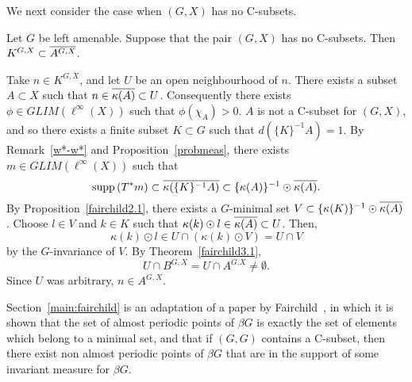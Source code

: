 We next consider the case when $(G,X)$ has no C-subsets.

\begin{proposition}
Let $G$ be left amenable.  Suppose that the pair $(G,X)$ has no C-subsets.
Then $K^{G,X} \subset \overline{A^{G,X}}$.
\end{proposition}
\proof
Take $n\in K^{G,X}$, and let $U$ be an open neighbourhood of $n$.  There exists a subset
$A\subset X$ such that $n\in \overline{\kappa(A)} \subset U$.  Consequently there exists $\phi\in GLIM(\ell^\infty(X))$
such that $\phi(\chi_A) > 0$.  $A$ is not a C-subset for $(G,X)$, and so there exists a finite
subset $K\subset G$ such that $d(\{K\}^{-1}A) = 1$.  By Remark~\ref{w*-w*} and
Proposition~\ref{probmeas}, there exists $m\in GLIM(\ell^\infty(X))$
such that
\[
\operatorname{supp\,}(T^*m) \subset \overline{\kappa(\{K\}^{-1}A)} \subset \{\kappa(A)\}^{-1} \odot \overline{\kappa(A)}.
\]
By Proposition~\ref{fairchild2.1}, there exists
a $G$-minimal set $V\subset \{\kappa(K)\}^{-1} \odot \overline{\kappa(A)}$.
Choose $l\in V$ and $k\in K$ such that $\kappa(k)\odot l \in \overline{\kappa(A)} \subset U$.
Then,
\[
\kappa(k)\odot l \in U\cap(\kappa(k)\odot V) = U\cap V
\]
by the $G$-invariance of $V$.  By Theorem~\ref{fairchild3.1},
\[
U\cap B^{G,X} = U\cap A^{G.X} \neq \emptyset.
\]
Since $U$ was arbitrary, $n\in A^{G,X}$.
\done

\begin{remark}
Section~\ref{main:fairchild} is an adaptation of a paper by Fairchild~\cite{fairchild},
in which it is shown that the set of almost periodic points of $\beta G$
is exactly the set of elements which belong to a minimal set, and that
if $(G,G)$ contains a C-subset, then there exist non almost periodic
points of $\beta G$ that are in the support of some invariant measure
for $\beta G$.

\end{remark}